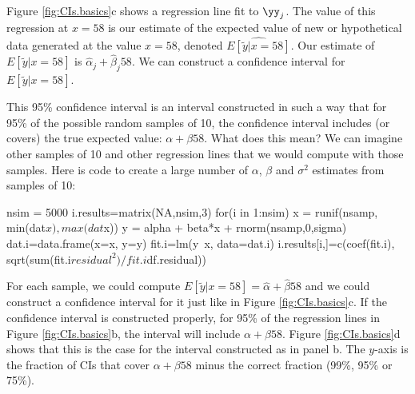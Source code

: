 Figure \ref{fig:CIs.basics}c shows a regression line fit to $\yy_j$. The value of this regression at $x=58$ is our estimate of the expected value of new or hypothetical data generated at the value $x=58$, denoted $\widehat{E[\tilde{y}|x=58]}$. Our estimate of $E[\tilde{y}|x=58]$ is $\hat{\alpha}_j + \hat{\beta}_j 58$.  We can construct a confidence interval for $E[\tilde{y}|x=58]$. 

This 95\% confidence interval is an interval constructed in such a way that for 95\% of the possible random samples of 10, the confidence interval includes (or covers) the true expected value: $\alpha + \beta 58$.  What does this mean?  We can imagine other samples of 10 and other regression lines that we would compute with those samples. Here is  code to create a large number of $\alpha$, $\beta$ and $\sigma^2$ estimates from samples of 10:
\begin{Schunk}
\begin{Sinput}
 nsim = 5000
 i.results=matrix(NA,nsim,3)
 for(i in 1:nsim){
   x = runif(nsamp, min(dat$x), max(dat$x))
   y = alpha + beta*x + rnorm(nsamp,0,sigma)
   dat.i=data.frame(x=x, y=y)
   fit.i=lm(y~x, data=dat.i)
   i.results[i,]=c(coef(fit.i), 
                   sqrt(sum(fit.i$residual^2)/fit.i$df.residual))
 }
\end{Sinput}
\end{Schunk}
For each sample, we could compute $E[\tilde{y}|x=58]=\hat{\alpha}+\hat{\beta} 58$ and we could construct a confidence interval for it just like in Figure \ref{fig:CIs.basics}c.  If the confidence interval is constructed properly, for 95\% of the regression lines in Figure \ref{fig:CIs.basics}b, the interval will include $\alpha + \beta 58$.  Figure \ref{fig:CIs.basics}d shows that this is the case for the interval constructed as in panel b. The $y$-axis is the fraction of CIs that cover $\alpha + \beta 58$ minus the correct fraction (99\%, 95\% or 75\%).

% 
% 

